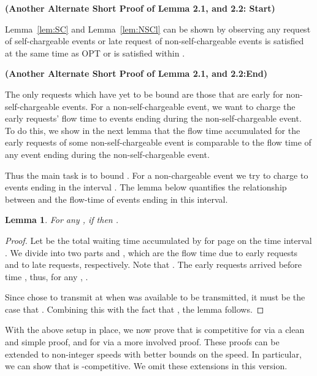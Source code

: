 \documentclass[11pt]{article}
\newtheorem{lemma}{Lemma}[section]
\begin{document}
\begin{titlepage}
\textbf{(Another Alternate Short Proof of Lemma 2.1, and 2.2: Start)}

Lemma~\ref{lem:SC} and Lemma~\ref{lem:NSCl} can be shown by observing
any request of self-chargeable events or late request of
non-self-chargeable events is satisfied at the same time as OPT or is
satisfied within .

\textbf{(Another Alternate Short Proof of Lemma 2.1, and 2.2:End)}

The only requests which have yet to be bound are those that are early
for non-self-chargeable events.  For a non-self-chargeable event, we
want to charge the early requests' flow time to events ending during
the non-self-chargeable event. To do this, we show in the next lemma
that the flow time accumulated for the early requests of some
non-self-chargeable event is comparable to the flow time of any event
ending during the non-self-chargeable event.

\fi

Thus the main task is to bound . For a non-chargeable event
 we try to charge  to events ending in the interval
. The lemma below quantifies the relationship
between  and the flow-time of events ending in this interval.

\begin{lemma}
  \label{lem:close} For any , if  then .
\end{lemma}

\begin{proof}
  Let  be the total waiting time accumulated by  for
  page  on the time interval . We divide
   into two parts  and , which
  are the flow time due to early requests and to late requests,
  respectively. Note that .
  The early requests arrived before time , thus, for any , .

  Since  chose to transmit  at  when  was
  available to be transmitted, it must be the case that . Combining this with the
  fact that , the lemma follows.

\end{proof}

With the above setup in place, we now prove that  is 
competitive for  via a clean and simple proof, and for  via
a more involved proof. These proofs can be extended to non-integer
speeds with better bounds on the speed. In particular, we can show
that  is -competitive. We omit
these extensions in this version.

\iffalse First it is shown that with -speed the algorithm  achieves a competitive ratio of . This
proof is simple and is used to illustrate our techniques.  If non-integer speeds are allowed, this proof can be
extended to show that  is -competitive. We later improve our analysis to -speed with
a competitive ratio of . If non-integer speeds are used, this proof can be extended to show  is -competitive. \fi \vspace{-3mm}

\end{titlepage}
\end{document}
